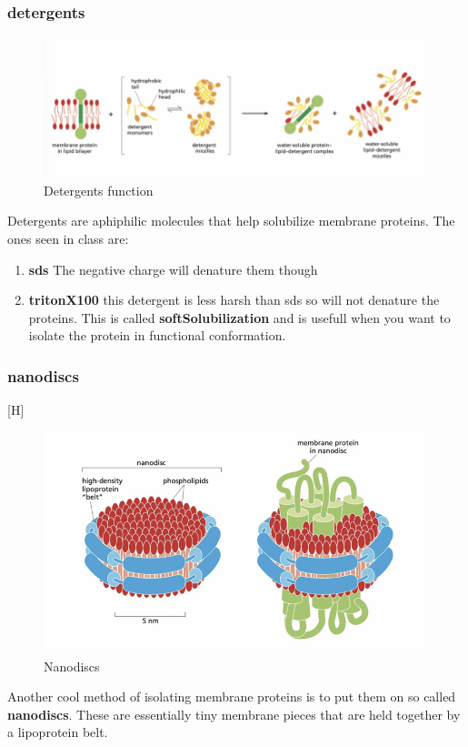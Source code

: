 \documentclass[../main.tex]{subfiles}
\begin{document}
\subsubsection{detergents}

\begin{figure}[H]
    \centering
    \includegraphics[width=\linewidth]{detergents.png}
    \caption{Detergents function}
    \label{fig:enter-label}
\end{figure}
Detergents are aphiphilic molecules that help solubilize membrane proteins. The ones seen in class are:
\begin{enumerate}
    \item \textbf{\gls{sds}} The negative charge will denature them though
    \item \textbf{\gls{tritonX100}} this detergent is less harsh than sds so will not denature the proteins. This is called \textbf{\gls{softSolubilization}} and is usefull when you want to isolate the protein in functional conformation.
    
\end{enumerate}


\subsubsection{nanodiscs}[H]
\begin{figure}
    \centering
    \includegraphics[width=0.5\linewidth]{nanodiscs.png}
    \caption{Nanodiscs}
    \label{fig:enter-label}
\end{figure}
Another cool method of isolating membrane proteins is to put them on so called \textbf{nanodiscs}. These are essentially tiny membrane pieces that are held together by a lipoprotein belt. 
\end{document}
